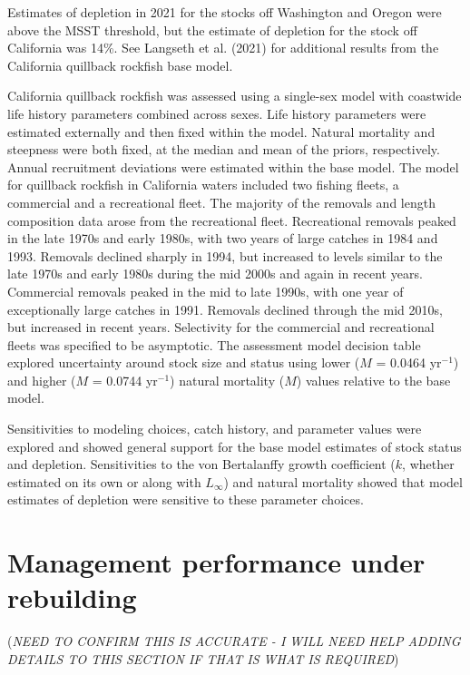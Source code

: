 \documentclass[11pt,
  letterpaper,
]{article}
\begin{document}
Estimates of depletion in 2021 for the stocks off Washington and Oregon were above the MSST threshold, but the estimate of depletion for the stock off California was 14\%. See Langseth et al. (2021) for additional results from the California quillback rockfish base model.

California quillback rockfish was assessed using a single-sex model with coastwide life history parameters combined across sexes. Life history parameters were estimated externally and then fixed within the model. Natural mortality and steepness were both fixed, at the median and mean of the priors, respectively. Annual recruitment deviations were estimated within the base model. The model for quillback rockfish in California waters included two fishing fleets, a commercial and a recreational fleet. The majority of the removals and length composition data arose from the recreational fleet. Recreational removals peaked in the late 1970s and early 1980s, with two years of large catches in 1984 and 1993. Removals declined sharply in 1994, but increased to levels similar to the late 1970s and early 1980s during the mid 2000s and again in recent years. Commercial removals peaked in the mid to late 1990s, with one year of exceptionally large catches in 1991. Removals declined through the mid 2010s, but increased in recent years. Selectivity for the commercial and recreational fleets was specified to be asymptotic. The assessment model decision table explored uncertainty around stock size and status using lower (\(M\) = 0.0464 yr\(^{-1}\)) and higher (\(M\) = 0.0744 yr\(^{-1}\)) natural mortality (\(M\)) values relative to the base model.

Sensitivities to modeling choices, catch history, and parameter values were explored and showed general support for the base model estimates of stock status and depletion. Sensitivities to the von Bertalanffy growth coefficient (\(k\), whether estimated on its own or along with \(L_\infty\)) and natural mortality showed that model estimates of depletion were sensitive to these parameter choices.

\hypertarget{management-performance-under-rebuilding}{%
\section{Management performance under rebuilding}\label{management-performance-under-rebuilding}}

(\emph{NEED TO CONFIRM THIS IS ACCURATE - I WILL NEED HELP ADDING DETAILS TO THIS SECTION IF THAT IS WHAT IS REQUIRED})
\end{document}
